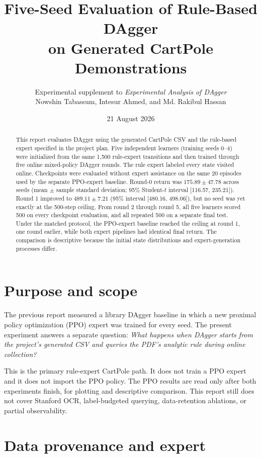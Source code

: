 \documentclass[11pt]{article}
\title{\textbf{Five-Seed Evaluation of Rule-Based DAgger\\on Generated CartPole Demonstrations}}
\author{Experimental supplement to \emph{Experimental Analysis of DAgger}\\
Nowshin Tabassum, Intesur Ahmed, and Md. Rakibul Hassan}
\date{21 August 2026}
\begin{document}
\maketitle

\begin{abstract}
This report evaluates DAgger using the generated CartPole CSV and the rule-based expert specified in the project plan. Five independent learners (training seeds 0--4) were initialized from the same 1,500 rule-expert transitions and then trained through five online mixed-policy DAgger rounds. The rule expert labeled every state visited online. Checkpoints were evaluated without expert assistance on the same 20 episodes used by the separate PPO-expert baseline. Round-0 return was $175.89\pm47.78$ across seeds (mean $\pm$ sample standard deviation; 95\% Student-$t$ interval [116.57, 235.21]). Round 1 improved to $489.11\pm7.21$ (95\% interval [480.16, 498.06]), but no seed was yet exactly at the 500-step ceiling. From round 2 through round 5, all five learners scored 500 on every checkpoint evaluation, and all repeated 500 on a separate final test. Under the matched protocol, the PPO-expert baseline reached the ceiling at round 1, one round earlier, while both expert pipelines had identical final return. The comparison is descriptive because the initial state distributions and expert-generation processes differ.
\end{abstract}

\section{Purpose and scope}

The previous report measured a library DAgger baseline in which a new proximal policy optimization (PPO) expert was trained for every seed. The present experiment answers a separate question: \emph{What happens when DAgger starts from the project's generated CSV and queries the PDF's analytic rule during online collection?}

This is the primary rule-expert CartPole path. It does not train a PPO expert and it does not import the PPO policy. The PPO results are read only after both experiments finish, for plotting and descriptive comparison. This report still does not cover Stanford OCR, label-budgeted querying, data-retention ablations, or partial observability.

\section{Data provenance and expert}
\end{document}
